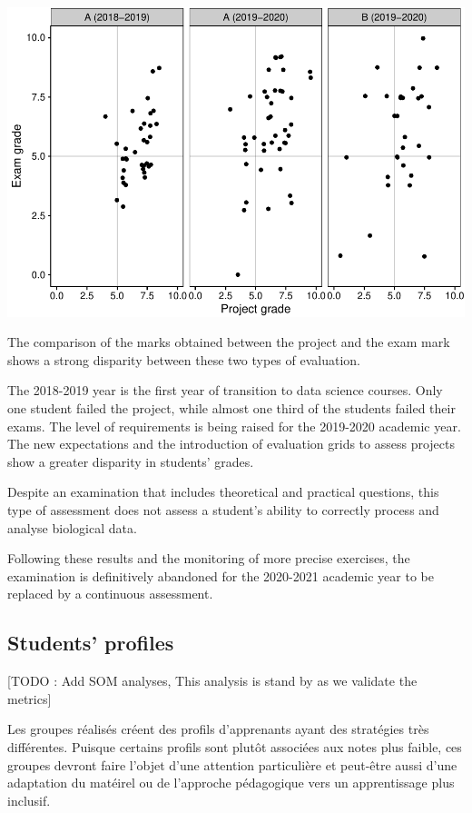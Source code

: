 \documentclass[
]{article}
\begin{document}
\includegraphics{teaching_data_science_files/figure-latex/unnamed-chunk-3-1.pdf}

The comparison of the marks obtained between the project and the exam
mark shows a strong disparity between these two types of evaluation.

The 2018-2019 year is the first year of transition to data science
courses. Only one student failed the project, while almost one third of
the students failed their exams. The level of requirements is being
raised for the 2019-2020 academic year. The new expectations and the
introduction of evaluation grids to assess projects show a greater
disparity in students' grades.

Despite an examination that includes theoretical and practical
questions, this type of assessment does not assess a student's ability
to correctly process and analyse biological data.

Following these results and the monitoring of more precise exercises,
the examination is definitively abandoned for the 2020-2021 academic
year to be replaced by a continuous assessment.

\hypertarget{students-profiles}{%
\subsection{Students' profiles}\label{students-profiles}}

{[}TODO : Add SOM analyses, This analysis is stand by as we validate the
metrics{]}

Les groupes réalisés créent des profils d'apprenants ayant des
stratégies très différentes. Puisque certains profils sont plutôt
associées aux notes plus faible, ces groupes devront faire l'objet d'une
attention particulière et peut-être aussi d'une adaptation du matéirel
ou de l'approche pédagogique vers un apprentissage plus inclusif.
\end{document}
